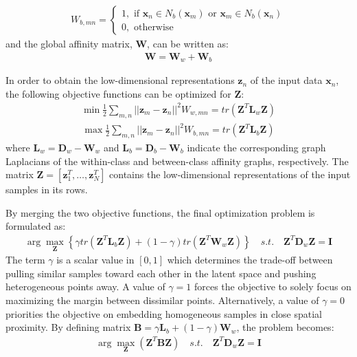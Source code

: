 \begin{align}
	W_{b,mn} =
	\begin{cases}
		1, \text{ if } \bm{x}_{n} \in N_{b}(\bm{x}_{m}) \text{ or } \bm{x}_{m} \in N_{b}(\bm{x}_{n}) \\
	0, \text{ otherwise}
	\end{cases}
\end{align}
\noindent
and the global affinity matrix, $\bm{W}$, can be written as:
\begin{align}
	\bm{W} = \bm{W}_{w} + \bm{W}_{b}
\end{align}

In order to obtain the low-dimensional representations $\bm{z}_n$ of the input data $\bm{x}_{n}$, the following objective functions can be optimized for $\bm{Z}$:
\begin{align}
	\min \frac{1}{2} \sum_{m,n} || \bm{z}_{m} - \bm{z}_{n} ||^{2} W_{w,mn} = tr(\bm{Z}^{T}\bm{L}_{w}\bm{Z})
\end{align}
\begin{align}
\max \frac{1}{2} \sum_{m,n} || \bm{z}_{m} - \bm{z}_{n} ||^{2} W_{b,mn} = tr(\bm{Z}^{T}\bm{L}_{b}\bm{Z})
\end{align}
\noindent
where $\bm{L}_{w} = \bm{D}_{w} - \bm{W}_{w}$ and $\bm{L}_{b} = \bm{D}_{b} - \bm{W}_{b}$ indicate the corresponding graph Laplacians of the within-class and between-class affinity graphs, respectively.  The matrix $\bm{Z} = [\bm{z}^{T}_{1}, \dots, \bm{z}^{T}_{N}]$ contains the low-dimensional representations of the input samples in its rows.

By merging the two objective functions, the final optimization problem is formulated as:
\begin{align}
	\arg\max_{\bm{Z}} \left \{  \gamma tr(\bm{Z}^{T}\bm{L}_{b}\bm{Z}) + (1- \gamma)tr(\bm{Z}^{T}\bm{W}_{w}\bm{Z}) \right \} \quad s.t. \quad \bm{Z}^{T}\bm{D}_{w}\bm{Z} = \bm{I}
\end{align}
The term $\gamma$ is a scalar value in $[0,1]$ which determines the trade-off between pulling similar samples toward each other in the latent space and pushing heterogeneous points away.  A value of $\gamma = 1$ forces the objective to solely focus on maximizing the margin between dissimilar points.  Alternatively, a value of $\gamma = 0$ priorities the objective on embedding homogeneous samples in close spatial proximity. By defining matrix $\bm{B} = \gamma \bm{L}_{b} + (1 - \gamma)\bm{W}_{w}$, the problem becomes:
\begin{align}
	\arg\max_{\bm{Z}} \left ( \bm{Z}^{T}\bm{B}\bm{Z}  \right ) \quad s.t. \quad \bm{Z}^{T}\bm{D}_{w}\bm{Z} = \bm{I}
\end{align}

